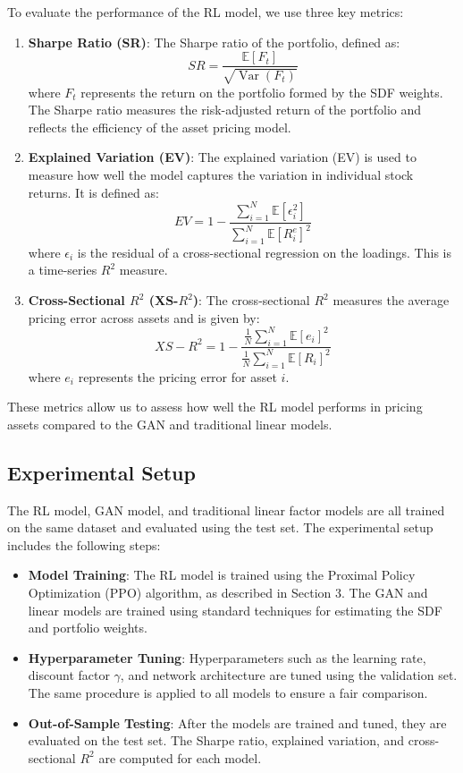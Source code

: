 To evaluate the performance of the RL model, we use three key metrics:
\begin{enumerate}
    \item \textbf{Sharpe Ratio (SR)}: The Sharpe ratio of the portfolio, defined as:
    \[
    SR = \frac{\mathbb{E}[F_t]}{\sqrt{\operatorname{Var}(F_t)}}
    \]
    where $F_t$ represents the return on the portfolio formed by the SDF weights. The Sharpe ratio measures the risk-adjusted return of the portfolio and reflects the efficiency of the asset pricing model.
    
    \item \textbf{Explained Variation (EV)}: The explained variation (EV) is used to measure how well the model captures the variation in individual stock returns. It is defined as:
    \[
    EV = 1 - \frac{\sum_{i=1}^N \mathbb{E}\left[\epsilon_i^2\right]}{\sum_{i=1}^N \mathbb{E}\left[R_i^e\right]^2}
    \]
    where $\epsilon_i$ is the residual of a cross-sectional regression on the loadings. This is a time-series $R^2$ measure.
    
    \item \textbf{Cross-Sectional $R^2$ (XS-\(R^2\))}: The cross-sectional $R^2$ measures the average pricing error across assets and is given by:
    \[
    XS-R^2 = 1 - \frac{\frac{1}{N} \sum_{i=1}^N \mathbb{E}\left[e_i\right]^2}{\frac{1}{N} \sum_{i=1}^N \mathbb{E}\left[R_i\right]^2}
    \]
    where $e_i$ represents the pricing error for asset $i$.
\end{enumerate}

These metrics allow us to assess how well the RL model performs in pricing assets compared to the GAN and traditional linear models.

\subsection{Experimental Setup}

The RL model, GAN model, and traditional linear factor models are all trained on the same dataset and evaluated using the test set. The experimental setup includes the following steps:

\begin{itemize}
    \item \textbf{Model Training}: The RL model is trained using the Proximal Policy Optimization (PPO) algorithm, as described in Section 3. The GAN and linear models are trained using standard techniques for estimating the SDF and portfolio weights.
    \item \textbf{Hyperparameter Tuning}: Hyperparameters such as the learning rate, discount factor $\gamma$, and network architecture are tuned using the validation set. The same procedure is applied to all models to ensure a fair comparison.
    \item \textbf{Out-of-Sample Testing}: After the models are trained and tuned, they are evaluated on the test set. The Sharpe ratio, explained variation, and cross-sectional $R^2$ are computed for each model.
\end{itemize}

